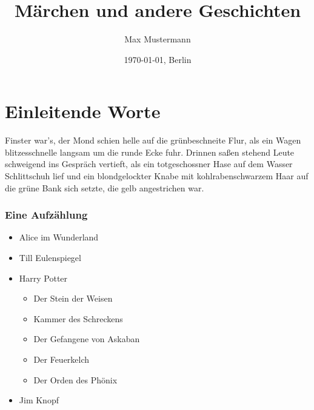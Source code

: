 \documentclass[11pt]{scrartcl}
\title{Märchen und andere Geschichten}
\author{Max Mustermann}
\date{\today{}, Berlin}
\begin{document}
\maketitle
 
\section{Einleitende Worte}
\label{sec:einleitende-worte} %


 
Finster war's, der Mond schien helle auf die grünbeschneite Flur, als
ein Wagen blitzesschnelle langsam um die runde Ecke fuhr. Drinnen
saßen stehend Leute schweigend ins Gespräch vertieft, als ein
totgeschossner Hase auf dem Wasser Schlittschuh lief und ein
blondgelockter Knabe mit kohlrabenschwarzem Haar auf die grüne Bank
sich setzte, die gelb angestrichen war. 


\subsubsection{Eine Aufzählung}

\begin{itemize}
  \item Alice im Wunderland
  \item Till Eulenspiegel
  \item Harry Potter
  \begin{itemize}
    \item Der Stein der Weisen
    \item Kammer des Schreckens
    \item Der Gefangene von Askaban
    \item Der Feuerkelch
    \item Der Orden des Phönix
  \end{itemize}
  \item Jim Knopf
\end{itemize}
\end{document}
